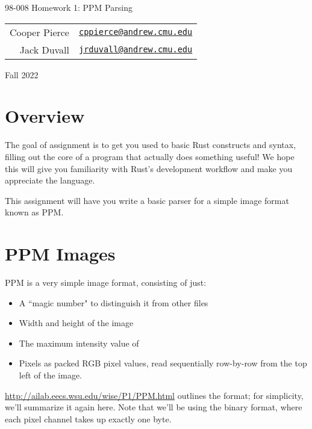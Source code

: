 \documentclass{article}
\newcommand{\longsemester}{Fall 2022}
\newcommand{\deptcode}{98}
\newcommand{\coursecode}{008}
\newcommand{\fullcoursecode}{\deptcode-\coursecode}
\begin{document}
\thispagestyle{empty}
\begin{center}
    \begin{minipage}{.85\textwidth}
        \centering
        {\huge {\fullcoursecode} Homework 1: PPM Parsing}

        \vspace{1em}

        \begin{tabular}{@{}rl@{}}
            Cooper Pierce & \href{mailto:cppierce@andrew.cmu.edu}{\texttt{cppierce@andrew.cmu.edu}} \\
            Jack Duvall & \href{mailto:jrduvall@andrew.cmu.edu}{\texttt{jrduvall@andrew.cmu.edu}} \\
        \end{tabular}

        \vspace{1em}

        \longsemester
    \end{minipage}
\end{center}

\section*{Overview}
The goal of assignment is to get you used to basic Rust constructs and syntax, filling out the core of a program that actually does something useful! We hope this will give you familiarity with Rust's development workflow and make you appreciate the language.

This assignment will have you write a basic parser for a simple image format known as PPM.

\section*{PPM Images}
PPM is a very simple image format, consisting of just:
\begin{itemize}
    \item A ``magic number" to distinguish it from other files
    \item Width and height of the image
    \item The maximum intensity value of
    \item Pixels as packed RGB pixel values, read sequentially row-by-row from the top left of the image.
\end{itemize}

\url{http://ailab.eecs.wsu.edu/wise/P1/PPM.html} outlines the format; for simplicity, we'll summarize it again here. Note that we'll be using the binary format, where each pixel channel takes up exactly one byte.
\end{document}

